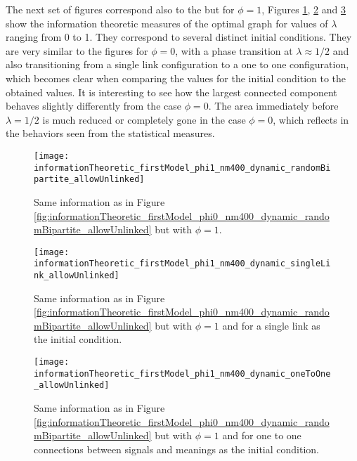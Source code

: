 


The next set of figures correspond also to the \firstmodel{} but for $\phi=1$, Figures  \ref{fig:informationTheoretic_firstModel_phi1_nm400_dynamic_randomBipartite_allowUnlinked},  \ref{fig:informationTheoretic_firstModel_phi1_nm400_dynamic_singleLink_allowUnlinked} and  \ref{fig:informationTheoretic_firstModel_phi1_nm400_dynamic_oneToOne_allowUnlinked} show the information theoretic measures of the optimal graph for values of $\lambda$ ranging from 0 to 1.
They correspond to several distinct initial conditions.
They are very similar to the figures for $\phi=0$, with a phase transition at $\lambda \approx 1/2$ and also transitioning from a single link configuration to a one to one configuration, which becomes clear when comparing the values for the initial condition to the obtained values.
It is interesting to see how the largest connected component behaves slightly differently from the case $\phi=0$.
The area immediately before $\lambda=1/2$ is much reduced or completely gone in the case $\phi=0$, which reflects in the behaviors seen from the statistical measures.

\begin{figure}
  \centering
  \texttt{[image: informationTheoretic\_firstModel\_phi1\_nm400\_dynamic\_randomBipartite\_allowUnlinked]}
  \caption{Same information as in Figure \ref{fig:informationTheoretic_firstModel_phi0_nm400_dynamic_randomBipartite_allowUnlinked} but with $\phi=1$.}
  \label{fig:informationTheoretic_firstModel_phi1_nm400_dynamic_randomBipartite_allowUnlinked}
\end{figure}

\begin{figure}
  \centering
  \texttt{[image: informationTheoretic\_firstModel\_phi1\_nm400\_dynamic\_singleLink\_allowUnlinked]}
  \caption{Same information as in Figure \ref{fig:informationTheoretic_firstModel_phi0_nm400_dynamic_randomBipartite_allowUnlinked} but with $\phi=1$ and for a single link as the initial condition.}
  \label{fig:informationTheoretic_firstModel_phi1_nm400_dynamic_singleLink_allowUnlinked}
\end{figure}

\begin{figure}
  \centering
  \texttt{[image: informationTheoretic\_firstModel\_phi1\_nm400\_dynamic\_oneToOne\_allowUnlinked]}
  \caption{Same information as in Figure \ref{fig:informationTheoretic_firstModel_phi0_nm400_dynamic_randomBipartite_allowUnlinked} but with $\phi=1$ and for one to one connections between signals and meanings as the initial condition.}
  \label{fig:informationTheoretic_firstModel_phi1_nm400_dynamic_oneToOne_allowUnlinked}
\end{figure}

